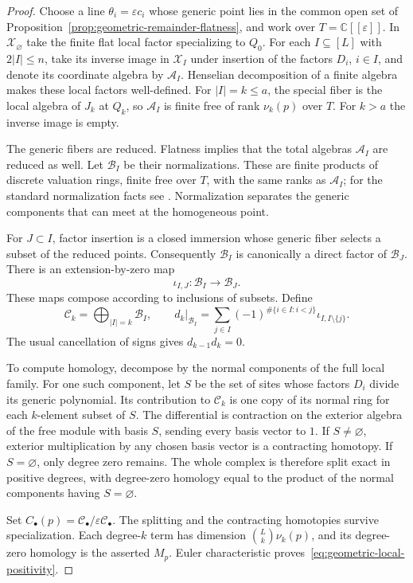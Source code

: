\documentclass[11pt]{article}
\theoremstyle{definition}
\newcommand{\C}{\mathbb C}
\begin{document}
\begin{proof}
Choose a line $\theta_i=\varepsilon c_i$ whose generic point lies
in the common open set of Proposition~\ref{prop:geometric-remainder-flatness},
and work over $T=\C[[\varepsilon]]$. In $\mathcal X_\varnothing$
take the finite flat local factor specializing to $Q_0$. For each
$I\subseteq[L]$ with $2|I|\le n$, take its inverse image in $\mathcal X_I$ under
insertion of the factors $D_i$, $i\in I$, and denote its coordinate
algebra by $\mathcal A_I$. Henselian decomposition of a finite
algebra makes these local factors well-defined. For $|I|=k\le a$,
the special fiber is the local algebra of $J_k$ at $Q_k$, so
$\mathcal A_I$ is finite free of rank $\nu_k(p)$ over $T$.
For $k>a$ the inverse image is empty.

The generic fibers are reduced. Flatness implies that the total
algebras $\mathcal A_I$ are reduced as well. Let
$\mathcal B_I$ be their normalizations. These are finite products
of discrete valuation rings, finite free over $T$, with the same
ranks as $\mathcal A_I$; for the standard normalization facts see
\cite[Tag~035E]{Stacks}. Normalization separates the generic
components that can meet at the homogeneous point.

For $J\subset I$, factor insertion is a closed immersion whose
generic fiber selects a subset of the reduced points. Consequently
$\mathcal B_I$ is canonically a direct factor of $\mathcal B_J$.
There is an extension-by-zero map
\[
 \iota_{I,J}:\mathcal B_I\longrightarrow\mathcal B_J.
\]
These maps compose according to inclusions of subsets. Define
\[
 \mathcal C_k=\bigoplus_{|I|=k}\mathcal B_I,
 \qquad
 \left.d_k\right|_{\mathcal B_I}
 =\sum_{j\in I}(-1)^{\#\{i\in I:i<j\}}
             \iota_{I,I\setminus\{j\}}.
\]
The usual cancellation of signs gives $d_{k-1}d_k=0$.

To compute homology, decompose by the normal components of the
full local family. For one such component, let $S$ be the set of
sites whose factors $D_i$ divide its generic polynomial. Its
contribution to $\mathcal C_k$ is one copy of its normal ring for
each $k$-element subset of $S$. The differential is contraction
on the exterior algebra of the free module with basis $S$, sending
every basis vector to $1$. If $S\ne\varnothing$, exterior
multiplication by any chosen basis vector is a contracting homotopy.
If $S=\varnothing$, only degree zero remains. The whole complex
is therefore split exact in positive degrees, with degree-zero
homology equal to the product of the normal components having
$S=\varnothing$.

Set $C_\bullet(p)=\mathcal C_\bullet/\varepsilon\mathcal C_\bullet$.
The splitting and the contracting homotopies survive specialization.
Each degree-$k$ term has dimension $\binom Lk\nu_k(p)$, and its
degree-zero homology is the asserted $M_p$. Euler characteristic
proves~\eqref{eq:geometric-local-positivity}.
\end{proof}
\end{document}
